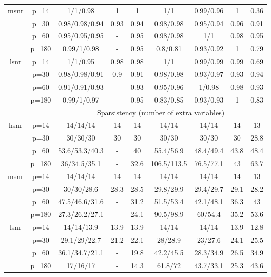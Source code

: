 \begin{table}[ht]
{\begin{tabular}{|c|c|ccccccc|}
  \midrule\multirow{4}[2]{*}{msnr} & p=14 & 1/1/0.98 & 1 & 1 & 1/1 & 0.99/0.96 & 1 & 0.36 \\ 
   & p=30 & 0.98/0.98/0.94 & 0.93 & 0.94 & 0.98/0.98 & 0.95/0.94 & 0.96 & 0.91 \\ 
   & p=60 & 0.95/0.95/0.95 & - & 0.95 & 0.98/0.98 & 1/1 & 0.98 & 0.95 \\ 
   & p=180 & 0.99/1/0.98 & - & 0.95 & 0.8/0.81 & 0.93/0.92 & 1 & 0.79 \\ 
  \midrule\multirow{4}[2]{*}{lsnr} & p=14 & 1/1/0.95 & 0.98 & 0.98 & 1/1 & 0.99/0.99 & 0.99 & 0.69 \\ 
   & p=30 & 0.98/0.98/0.91 & 0.9 & 0.91 & 0.98/0.98 & 0.93/0.97 & 0.93 & 0.94 \\ 
   & p=60 & 0.91/0.91/0.93 & - & 0.93 & 0.95/0.96 & 1/0.98 & 0.98 & 0.93 \\ 
   & p=180 & 0.99/1/0.97 & - & 0.95 & 0.83/0.85 & 0.93/0.93 & 1 & 0.83 \\ 
   \midrule 
 \multicolumn{1}{|c}{} &       & \multicolumn{7}{c|}{Sparsistency (number of extra variables)} \\
\midrule\multirow{4}[2]{*}{hsnr} & p=14 & 14/14/14 & 14 & 14 & 14/14 & 14/14 & 14 & 13 \\ 
   & p=30 & 30/30/30 & 30 & 30 & 30/30 & 30/30 & 30 & 28.8 \\ 
   & p=60 & 53.6/53.3/40.3 & - & 40 & 55.4/56.9 & 48.4/49.4 & 43.8 & 48.4 \\ 
   & p=180 & 36/34.5/35.1 & - & 32.6 & 106.5/113.5 & 76.5/77.1 & 43 & 63.7 \\ 
  \midrule\multirow{4}[2]{*}{msnr} & p=14 & 14/14/14 & 14 & 14 & 14/14 & 14/14 & 14 & 13 \\ 
   & p=30 & 30/30/28.6 & 28.3 & 28.5 & 29.8/29.9 & 29.4/29.7 & 29.1 & 28.2 \\ 
   & p=60 & 47.5/46.6/31.6 & - & 31.2 & 51.5/53.4 & 42.1/48.1 & 36.3 & 43 \\ 
   & p=180 & 27.3/26.2/27.1 & - & 24.1 & 90.5/98.9 & 60/54.4 & 35.2 & 53.6 \\ 
  \midrule\multirow{4}[2]{*}{lsnr} & p=14 & 14/14/13.9 & 13.9 & 13.9 & 14/14 & 14/14 & 13.9 & 12.8 \\ 
   & p=30 & 29.1/29/22.7 & 21.2 & 22.1 & 28/28.9 & 23/27.6 & 24.1 & 25.5 \\ 
   & p=60 & 36.1/34.7/21.1 & - & 19.8 & 42.2/45.5 & 28.3/34.9 & 26.5 & 34.9 \\ 
   & p=180 & 17/16/17 & - & 14.3 & 61.8/72 & 43.7/33.1 & 25.3 & 43.6 \\ 
   \bottomrule 
\end{tabular}
}
\end{table}
